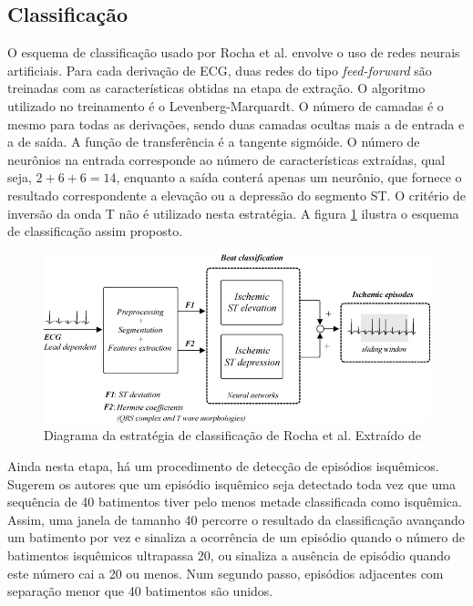 \subsection*{Classificação}
O esquema de classificação usado por Rocha et al. envolve o uso de redes neurais artificiais. Para cada derivação de ECG, duas redes do tipo \emph{feed-forward} são treinadas com as características obtidas na etapa de extração. O algoritmo utilizado no treinamento é o Levenberg-Marquardt. O número de camadas é o mesmo para todas as derivações, sendo duas camadas ocultas mais a de entrada e a de saída. A função de transferência é a tangente sigmóide. O número de neurônios na entrada corresponde ao número de características extraídas, qual seja, $2+6+6=14$, enquanto a saída conterá apenas um neurônio, que fornece o resultado correspondente a elevação ou a depressão do segmento ST. O critério de inversão da onda T não é utilizado nesta estratégia. A figura \ref{fig:rochaclass} ilustra o esquema de classificação assim proposto.

\begin{figure}[ht]
    \centering
    \includegraphics[width=400pt]{figures/chap5-rocha-class.png}
    \caption[Diagrama da estratégia de classificação de Rocha et al.]{Diagrama da estratégia de classificação de Rocha et al. Extraído de \cite{Rocha2010}}
    \label{fig:rochaclass}
\end{figure}

Ainda nesta etapa, há um procedimento de detecção de episódios isquêmicos. Sugerem os autores que um episódio isquêmico seja detectado toda vez que uma sequência de 40 batimentos tiver pelo menos metade classificada como isquêmica. Assim, uma janela de tamanho 40 percorre o resultado da classificação avançando um batimento por vez e sinaliza a ocorrência de um episódio quando o número de batimentos isquêmicos ultrapassa 20, ou sinaliza a ausência de episódio quando este número cai a 20 ou menos. Num segundo passo, episódios adjacentes com separação menor que 40 batimentos são unidos.


